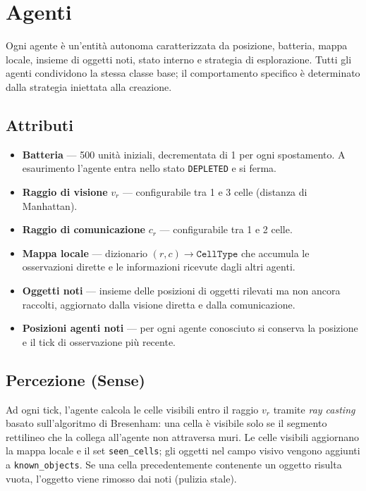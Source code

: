 \chapter{Agenti}

Ogni agente \`e un'entit\`a autonoma caratterizzata da posizione, batteria, mappa locale,
insieme di oggetti noti, stato interno e strategia di esplorazione. Tutti gli agenti
condividono la stessa classe base; il comportamento specifico \`e determinato dalla
strategia iniettata alla creazione.

\section{Attributi}

\begin{itemize}
  \item \textbf{Batteria} --- 500 unit\`a iniziali, decrementata di 1 per ogni spostamento.
        A esaurimento l'agente entra nello stato \texttt{DEPLETED} e si ferma.
  \item \textbf{Raggio di visione} $v_r$ --- configurabile tra 1 e 3 celle (distanza di Manhattan).
  \item \textbf{Raggio di comunicazione} $c_r$ --- configurabile tra 1 e 2 celle.
  \item \textbf{Mappa locale} --- dizionario $(r,c) \to \texttt{CellType}$ che accumula
        le osservazioni dirette e le informazioni ricevute dagli altri agenti.
  \item \textbf{Oggetti noti} --- insieme delle posizioni di oggetti rilevati ma non ancora raccolti,
        aggiornato dalla visione diretta e dalla comunicazione.
  \item \textbf{Posizioni agenti noti} --- per ogni agente conosciuto si conserva la posizione
        e il tick di osservazione pi\`u recente.
\end{itemize}

\section{Percezione (Sense)}

Ad ogni tick, l'agente calcola le celle visibili entro il raggio $v_r$ tramite
\textit{ray casting} basato sull'algoritmo di Bresenham: una cella \`e visibile solo se
il segmento rettilineo che la collega all'agente non attraversa muri. Le celle visibili
aggiornano la mappa locale e il set \texttt{seen\_cells}; gli oggetti nel campo visivo
vengono aggiunti a \texttt{known\_objects}. Se una cella precedentemente contenente un
oggetto risulta vuota, l'oggetto viene rimosso dai noti (pulizia stale).

